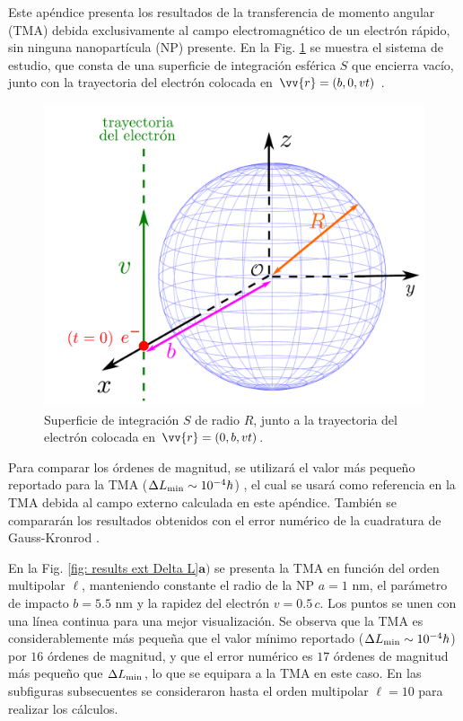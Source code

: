 \label{AppendixAMTextField}
Este apéndice presenta los resultados de la transferencia de momento angular (TMA) debida exclusivamente al campo electromagnético de un electrón rápido, sin ninguna nanopartícula (NP) presente. En la Fig. \ref{fig: system S Surface} se muestra el sistema de estudio, que consta de una superficie de integración esférica $S$ que encierra vacío, junto con la trayectoria del electrón colocada en $\vv{r} = (b, 0, vt)$ .
\begin{figure}[h!]
\centering
\includegraphics[width=0.5\linewidth]{17-imagenes/3-AppendixB/system_S.pdf}
\caption{\label{fig: system S Surface} Superficie de integración $S$ de radio $R$, junto a la trayectoria del electrón colocada en $\vv{r}=(0,b,vt)$.}
\end{figure}

Para comparar los órdenes de magnitud, se utilizará el valor más pequeño reportado para la TMA ($\Delta L_{\rm min} \sim 10^{-4} \hbar$) \cite{castellanos2021phdthesis, castellanos2021angular,castellanos2023theory}, el cual se usará como referencia en la TMA debida al campo externo calculada en este apéndice. También se compararán los resultados obtenidos con el error numérico de la cuadratura de Gauss-Kronrod \cite{kahaner1989numerical}.

En la Fig. \ref{fig: results ext Delta L}\hyperref[fig: results ext Delta L]{$\mathbf{a)}$} se presenta la TMA en función del orden multipolar $\ell$, manteniendo constante el radio de la NP $a=1$ nm, el parámetro de impacto $b = 5.5$ nm y la rapidez del electrón $v = 0.5\, c$. Los puntos se unen con una línea continua para una mejor visualización. Se observa que la TMA es considerablemente más pequeña que el valor mínimo reportado ($\Delta L_{\rm min} \sim 10^{-4} \hbar$) por $16$ órdenes de magnitud, y que el error numérico es $17$ órdenes de magnitud más pequeño que $\Delta L_{\rm min}$, lo que se equipara a la TMA en este caso. En las subfiguras subsecuentes se consideraron hasta el orden multipolar $\ell=10$ para realizar los cálculos. 

